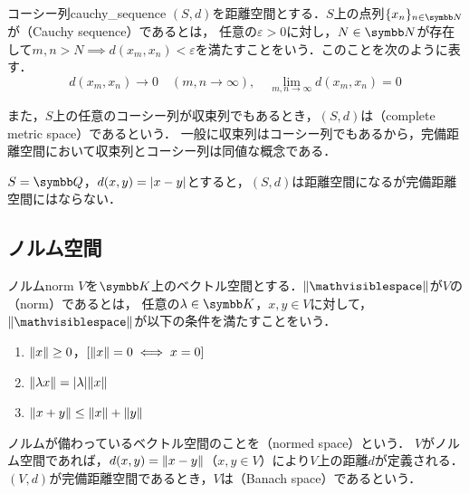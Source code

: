 \documentclass[../../main]{subfiles}
\begin{document}
\begin{definition}{コーシー列}{cauchy_sequence}
  \((S,d)\)を距離空間とする．\(S\)上の点列\(\seq{x_n}_{n\in\numset{N}}\)が（Cauchy sequence）であるとは，
  任意の\(\varepsilon>0\)に対し，\(N\in\numset{N}\)が存在して\(m,n>N\implies d(x_m,x_n)<\varepsilon\)を満たすことをいう．このことを次のように表す．
  \[
    d(x_m,x_n) \to 0\quad(m,n\to\infty),
    \quad\lim_{m,n\to\infty}d(x_m,x_n) = 0
  \]
\end{definition}

また，\(S\)上の任意のコーシー列が収束列でもあるとき，\((S,d)\)は（complete metric space）であるという．
一般に収束列はコーシー列でもあるから，完備距離空間において収束列とコーシー列は同値な概念である．

\begin{example}
  \(S=\numset{Q}\)，\(d(x,y)=\lvert x-y\rvert\)とすると，\((S,d)\)は距離空間になるが完備距離空間にはならない．
\end{example}

\subsection{ノルム空間}

\begin{definition}{ノルム}{norm}\indexsymbol{\(\vnorm{\holder}\)}
  \(V\)を\(\numset{K}\)上のベクトル空間とする．\(\vnorm{\holder}\)が\(V\)の（norm）であるとは，
  任意の\(\lambda\in\numset{K}\)，\(x,y\in V\)に対して，\(\vnorm{\holder}\)が以下の条件を満たすことをいう．
  \begin{enumerate}
    \item \(\lVert x\rVert\geq 0\)，\([\lVert x\rVert=0\iff x=0]\)
    \item \(\lVert\lambda x\rVert=\lvert\lambda\rvert\lVert x\rVert\)
    \item \(\lVert x+y\rVert\leq\lVert x\rVert+\lVert y\rVert\)
  \end{enumerate}
\end{definition}

ノルムが備わっているベクトル空間のことを（normed space）という．
\(V\)がノルム空間であれば，\(d(x,y)=\lVert x-y\rVert\)（\(x,y\in V\)）により\(V\)上の距離\(d\)が定義される．
\((V,d)\)が完備距離空間であるとき，\(V\)は（Banach space）であるという．
\end{document}
